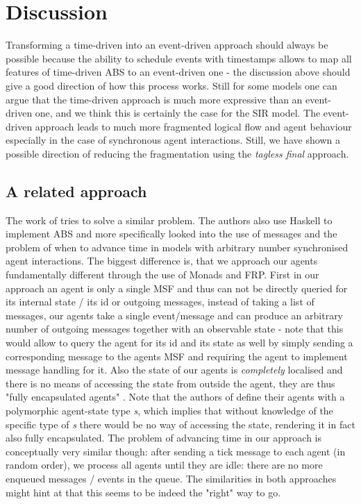 \section{Discussion}
Transforming a time-driven into an event-driven approach should always be possible because the ability to schedule events with timestamps allows to map all features of time-driven ABS to an event-driven one - the discussion above should give a good direction of how this process works. Still for some models one can argue that the time-driven approach is much more expressive than an event-driven one, and we think this is certainly the case for the SIR model. The event-driven approach leads to much more fragmented logical flow and agent behaviour especially in the case of synchronous agent interactions. Still, we have shown a possible direction of reducing the fragmentation using the \textit{tagless final} approach.

\subsection{A related approach}
The work of \cite{botta_time_2010} tries to solve a similar problem. The authors also use Haskell to implement ABS and more specifically looked into the use of messages and the problem of when to advance time in models with arbitrary number synchronised agent interactions.
The biggest difference is, that we approach our agents fundamentally different through the use of Monads and FRP. First in our approach an agent is only a single MSF and thus can not be directly queried for its internal state / its id or outgoing messages, instead of taking a list of messages, our agents take a single event/message and can produce an arbitrary number of outgoing messages together with an observable state - note that this would allow to query the agent for its id and its state as well by simply sending a corresponding message to the agents MSF and requiring the agent to implement message handling for it. Also the state of our agents is \textit{completely} localised and there is no means of accessing the state from outside the agent, they are thus "fully encapsulated agents" \cite{botta_time_2010}. Note that the authors of \cite{botta_time_2010} define their agents with a polymorphic agent-state type \textit{s}, which implies that without knowledge of the specific type of \textit{s} there would be no way of accessing the state, rendering it in fact also fully encapsulated.
The problem of advancing time in our approach is conceptually very similar though: after sending a tick message to each agent (in random order), we process all agents until they are idle: there are no more enqueued messages / events in the queue. The similarities in both approaches might hint at that this seems to be indeed the "right" way to go. %

